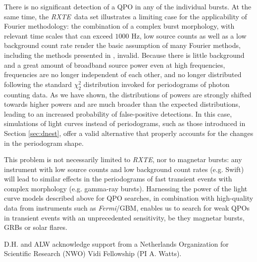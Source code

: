 \documentclass[numberedappendix]{emulateapj}
\newcommand{\hz}{\,\mathrm{Hz}}
\newcommand{\project}[1]{\textsl{#1}}
\newcommand{\fermi}{\project{Fermi}}
\newcommand{\rxte}{\project{RXTE}}
\begin{document}
There is no significant detection of a QPO in any of the individual bursts. At the same time, the \rxte\ data set illustrates a limiting case for the applicability of Fourier methodology: the combination of a complex burst morphology, with relevant time scales that can exceed $1000 \, \hz$, low source counts as well as a low background 
count rate render the basic assumption of many Fourier methods, including the methods presented in \citep{huppenkothen2013}, invalid. Because there is little background and a great amount of broadband source power even at high frequencies, frequencies are no longer independent of each other, and no longer distributed following the standard $\chi^2_2$ distribution invoked for periodograms of photon counting data. As we have shown, the distributions of powers are strongly shifted towards higher powers and are much broader than the expected distributions, leading to an increased probability of false-positive detections. In this case, simulations of light curves instead of periodograms, such as those introduced in Section \ref{sec:dnest}, offer a valid alternative that properly accounts for the changes in the periodogram shape. 

This problem is not necessarily limited to \rxte, nor to magnetar bursts: any instrument with low source counts and low background count rates (e.g. Swift) will lead to similar effects in the periodograms of fast transient events with complex morphology (e.g. gamma-ray bursts). Harnessing the power of the light curve models described above for QPO searches, in combination with high-quality data from instruments such as \fermi/GBM, enables us to search for weak QPOs in transient events with an unprecedented sensitivity, be they magnetar bursts, GRBs or solar flares. 


\acknowledgments
D.H. and ALW acknowledge support from a Netherlands Organization for Scientific Research (NWO) Vidi Fellowship (PI A. Watts).  



\end{document}
